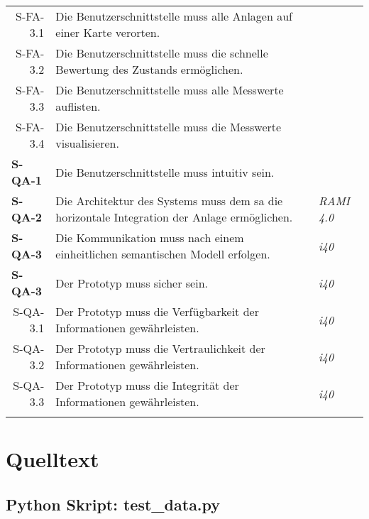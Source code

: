 \begin{tabularx}{\textwidth}{@{}lXp{2cm}@{}}
      \multicolumn{1}{r}{S-FA-3.1} &  Die Benutzerschnittstelle muss alle Anlagen auf einer Karte verorten. \\
      \multicolumn{1}{r}{S-FA-3.2} &  Die Benutzerschnittstelle muss die schnelle Bewertung des Zustands ermöglichen. \\
      \multicolumn{1}{r}{S-FA-3.3} &  Die Benutzerschnittstelle muss alle Messwerte auflisten. \\
      \multicolumn{1}{r}{S-FA-3.4} &  Die Benutzerschnittstelle muss die Messwerte visualisieren. \\
      \textbf{S-QA-1}              & Die Benutzerschnittstelle muss intuitiv sein.   \\
      \textbf{S-QA-2}              & Die Architektur des Systems muss dem \ac{sa} die horizontale Integration der Anlage ermöglichen.   & \textit{RAMI 4.0} \\
      \textbf{S-QA-3}              &  Die Kommunikation muss nach einem einheitlichen semantischen Modell erfolgen.  & \textit{\ac{i40}} \\
      \textbf{S-QA-3}              &  Der Prototyp muss sicher sein.  & \textit{\ac{i40}} \\
      \multicolumn{1}{r}{S-QA-3.1}              &  Der Prototyp muss die Verfügbarkeit der Informationen gewährleisten.  & \textit{\ac{i40}} \\
      \multicolumn{1}{r}{S-QA-3.2}              &  Der Prototyp muss die Vertraulichkeit der Informationen gewährleisten.  & \textit{\ac{i40}} \\
      \multicolumn{1}{r}{S-QA-3.3}              &  Der Prototyp muss die Integrität der Informationen gewährleisten. & \textit{\ac{i40}} \\
      \addlinespace
      \bottomrule
      \caption{Anforderungen aus Systemebene}
      \label{system_anforderungen}
  \end{tabularx}


   
\section{Quelltext}

\subsection{Python Skript: test\_data.py}

